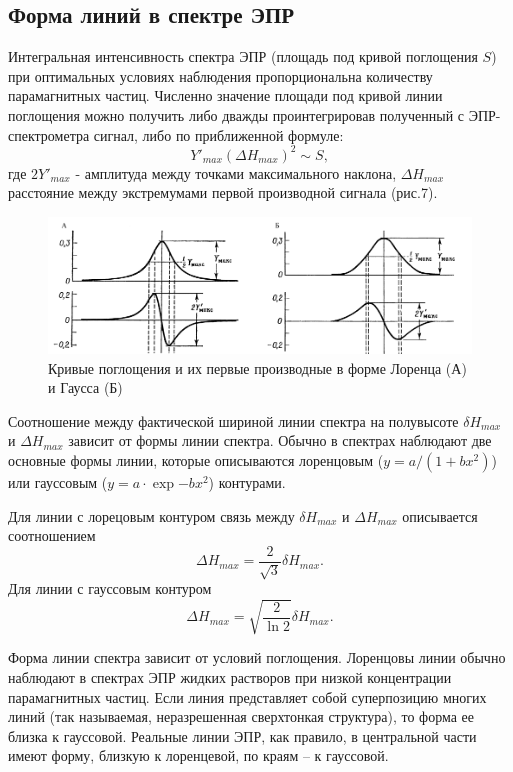 \documentclass[a4paper,14pt]{article}
\begin{document}
\subsection{Форма линий в спектре ЭПР}
Интегральная интенсивность спектра ЭПР (площадь под кривой поглощения $ S $) при оптимальных условиях наблюдения пропорциональна количеству парамагнитных частиц. Численно значение площади под кривой линии поглощения можно получить либо дважды проинтегрировав полученный с ЭПР-спектрометра сигнал, либо по приближенной формуле:
\begin{equation}
	Y'_{max}(\Delta H_{max})^2 \sim S,
\end{equation}
где $ 2Y'_{max} $ - амплитуда между точками максимального наклона, $ \Delta H_{max} $ расстояние между экстремумами первой производной сигнала (рис.7).
\begin{figure}[h]
	\centering
	\includegraphics[width=0.7\linewidth]{рис7}
	\caption{Кривые поглощения и их первые производные в форме Лоренца (А) и Гаусса (Б)}
	\label{fig:7}
\end{figure}
\par
Соотношение между фактической шириной линии спектра на полувысоте $ \delta H_{max} $ и $ \Delta H_{max} $ зависит от формы линии спектра. Обычно в спектрах наблюдают две основные формы линии, которые описываются лоренцовым ($ y=a/(1+bx^2) $) или гауссовым ($ y=a \cdot \exp{-bx^2} $) контурами.
\par 
Для линии с лорецовым контуром связь между $ \delta H_{max} $ и $ \Delta H_{max} $ описывается соотношением
\begin{equation}
	 \Delta H_{max}  =\frac{2}{\sqrt{3}}  \delta H_{max} .
\end{equation}
Для линии с гауссовым контуром
\begin{equation}
	 \Delta H_{max} =\sqrt{\frac{2}{\ln{2}}}  \delta H_{max}. 
\end{equation}
\par
Форма линии спектра зависит от условий поглощения. Лоренцовы линии обычно наблюдают в спектрах ЭПР жидких растворов при низкой концентрации парамагнитных частиц. Если линия представляет собой суперпозицию многих линий (так называемая, неразрешенная сверхтонкая структура), то форма ее близка к гауссовой. Реальные линии ЭПР, как правило, в центральной части имеют форму, близкую к лоренцевой, по краям – к гауссовой.
\end{document}

